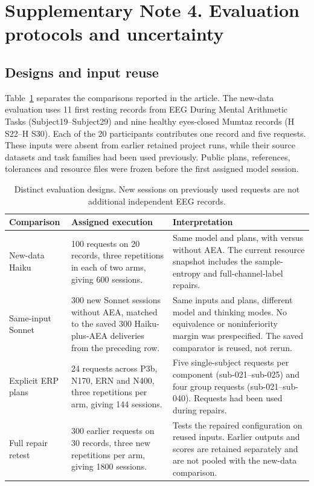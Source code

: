 \section*{Supplementary Note 4. Evaluation protocols and uncertainty}

\subsection*{Designs and input reuse}
Table~\ref{tab:evaluation} separates the comparisons reported in the article. The new-data evaluation uses 11 first resting records from EEG During Mental Arithmetic Tasks (Subject19--Subject29) and nine healthy eyes-closed Mumtaz records (H S22--H S30). Each of the 20 participants contributes one record and five requests. These inputs were absent from earlier retained project runs, while their source datasets and task families had been used previously. Public plans, references, tolerances and resource files were frozen before the first assigned model session.

\begin{table}[htbp]
\centering\small
\caption{Distinct evaluation designs. New sessions on previously used requests are not additional independent EEG records.}
\label{tab:evaluation}
\begin{tabularx}{\linewidth}{@{}l X X@{}}
\toprule
Comparison & Assigned execution & Interpretation\\
\midrule
New-data Haiku & 100 requests on 20 records, three repetitions in each of two arms, giving 600 sessions. & Same model and plans, with versus without AEA. The current resource snapshot includes the sample-entropy and full-channel-label repairs.\\
Same-input Sonnet & 300 new Sonnet sessions without AEA, matched to the saved 300 Haiku-plus-AEA deliveries from the preceding row. & Same inputs and plans, different model and thinking modes. No equivalence or noninferiority margin was prespecified. The saved comparator is reused, not rerun.\\
Explicit ERP plans & 24 requests across P3b, N170, ERN and N400, three repetitions per arm, giving 144 sessions. & Five single-subject requests per component (sub-021--sub-025) and four group requests (sub-021--sub-040). Requests had been used during repairs.\\
Full repair retest & 300 earlier requests on 30 records, three new repetitions per arm, giving 1800 sessions. & Tests the repaired configuration on reused inputs. Earlier outputs and scores are retained separately and are not pooled with the new-data comparison.\\
\bottomrule
\end{tabularx}
\end{table}

